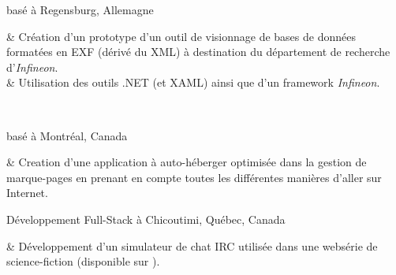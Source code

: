 	{ basé à Regensburg, Allemagne}

\begin{cvstate}
	\begin{cvtable}{2.5ex}
		{\tiny {}} & Création d'un prototype d'un outil de visionnage de bases de données formatées en EXF (dérivé du XML) à destination du département de recherche d'\textit{Infineon}.\\
		{\tiny {}} & Utilisation des outils .NET (\csharp et XAML) ainsi que d'un framework \textit{Infineon}.\\
	\end{cvtable}

	\\
\end{cvstate}


	{ basé à Montréal, Canada}

\begin{cvstate}
	\begin{cvtable}{2.5ex}
		{\tiny {}} & Creation d'une application à auto-héberger optimisée dans la gestion de marque-pages en prenant en compte toutes les différentes manières d'aller sur Internet.
	\end{cvtable}

\end{cvstate}

	{}{Développement Full-Stack }{}{}{à Chicoutimi, Québec, Canada}

\begin{cvstate}
	\begin{cvtable}{2.5ex}
		{\tiny {}} & Développement d'un simulateur de chat IRC utilisée dans une websérie de science-fiction (disponible sur ).
	\end{cvtable}

\end{cvstate}
